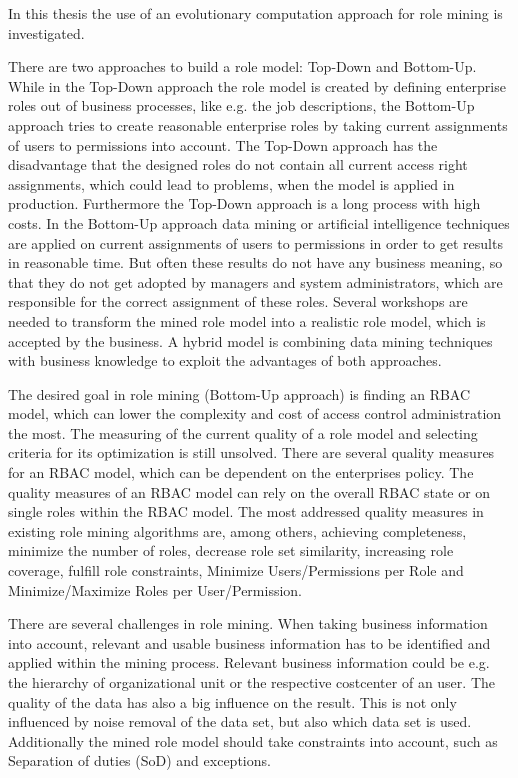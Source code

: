 In this thesis the use of an evolutionary computation approach for role mining is investigated.

\iffalse
There are two approaches to build a role model: Top-Down and Bottom-Up. While in the Top-Down approach the role model is created by defining enterprise roles out of business processes, like e.g. the job descriptions, the Bottom-Up approach tries to create reasonable enterprise roles by taking current assignments of users to permissions into account. The Top-Down approach has the disadvantage that the designed roles do not contain all current access right assignments, which could lead to problems, when the model is applied in production. Furthermore the Top-Down approach is a long process with high costs. In the Bottom-Up approach data mining or artificial intelligence techniques are applied on current assignments of users to permissions in order to get results in reasonable time. But often these results do not have any business meaning, so that they do not get adopted by managers and system administrators, which are responsible for the correct assignment of these roles. Several workshops are needed to transform the mined role model into a realistic role model, which is accepted by the business. A hybrid model is combining data mining techniques with business knowledge to exploit the advantages of both approaches.\cite{Frank} \cite{Xu} \cite{Coyne:2011}

The desired goal in role mining (Bottom-Up approach) is finding an RBAC model, which can lower the complexity and cost of access control administration the most. The measuring of the current quality of a role model and selecting criteria for its optimization is still unsolved. There are several quality measures for an RBAC model, which can be dependent on the enterprises policy. The quality measures of an RBAC model can rely on the overall RBAC state or on single roles within the RBAC model. The most addressed quality measures in existing role mining algorithms are, among others, achieving completeness, minimize the number of roles, decrease role set similarity, increasing role coverage, fulfill role constraints, Minimize Users/Permissions per Role and Minimize/Maximize Roles per User/Permission.\cite{Kunz}

There are several challenges in role mining. When taking business information into account, relevant and usable business information has to be identified and applied within the mining process. Relevant business information could be e.g. the hierarchy of organizational unit or the respective costcenter of an user. The quality of the data has also a big influence on the result. This is not only influenced by noise removal of the data set, but also which data set is used. Additionally the mined role model should take constraints into account, such as Separation of duties (SoD) and exceptions\cite{Lu}.

